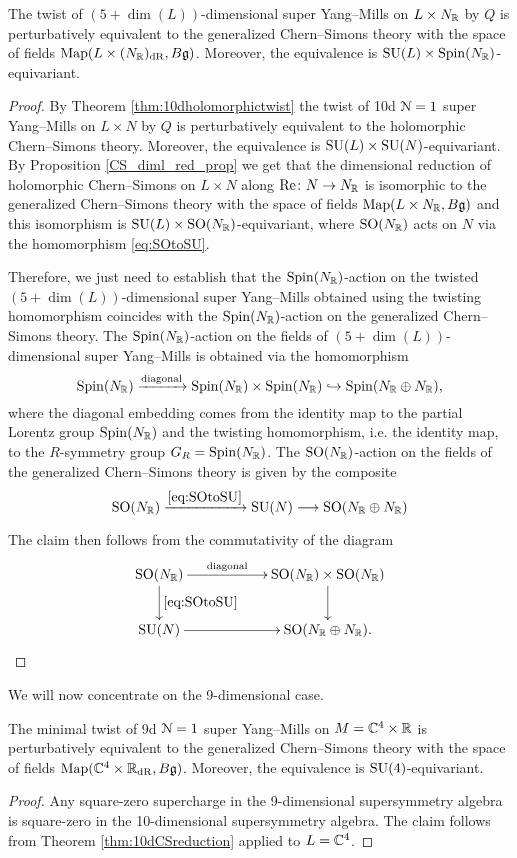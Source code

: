 \documentclass[10pt, oneside]{article}
\begin{document}
\begin{theorem}
The twist of $(5+\dim(L))$-dimensional super Yang--Mills on $L\times N_\mathbb R$ by $Q$ is perturbatively equivalent to the generalized Chern--Simons theory with the space of fields $\operatorname{Map}(L\times (N_\mathbb R)_{\mathrm{dR}}, B\mathfrak g)$. Moreover, the equivalence is $\mathrm{SU}(L)\times \mathrm{Spin}(N_\mathbb R)$-equivariant.
\label{thm:10dCSreduction}
\end{theorem}
\begin{proof}
By Theorem \ref{thm:10dholomorphictwist} the twist of 10d $\mathcal N=1$ super Yang--Mills on $L\times N$ by $Q$ is perturbatively equivalent to the holomorphic Chern--Simons theory. Moreover, the equivalence is $\mathrm{SU}(L)\times \mathrm{SU}(N)$-equivariant. By Proposition \ref{CS_diml_red_prop} we get that the dimensional reduction of holomorphic Chern--Simons on $L\times N$ along $\mathrm{Re}\colon N\rightarrow N_\mathbb R$ is isomorphic to the generalized Chern--Simons theory with the space of fields $\operatorname{Map}(L\times N_\mathbb R, B\mathfrak g)$ and this isomorphism is $\mathrm{SU}(L)\times \mathrm{SO}(N_\mathbb R)$-equivariant, where $\mathrm{SO}(N_\mathbb R)$ acts on $N$ via the homomorphism \eqref{eq:SOtoSU}.

Therefore, we just need to establish that the $\mathrm{Spin}(N_\mathbb R)$-action on the twisted $(5+\dim(L))$-dimensional super Yang--Mills obtained using the twisting homomorphism coincides with the $\mathrm{Spin}(N_\mathbb R)$-action on the generalized Chern--Simons theory. The $\mathrm{Spin}(N_\mathbb R)$-action on the fields of $(5+\dim(L))$-dimensional super Yang--Mills is obtained via the homomorphism
\[\mathrm{Spin}(N_\mathbb R)\xrightarrow{\mathrm{diagonal}}\mathrm{Spin}(N_\mathbb R)\times \mathrm{Spin}(N_\mathbb R)\hookrightarrow \mathrm{Spin}(N_\mathbb R\oplus N_\mathbb R),\]
where the diagonal embedding comes from the identity map to the partial Lorentz group $\mathrm{Spin}(N_\mathbb R)$ and the twisting homomorphism, i.e. the identity map, to the $R$-symmetry group $G_R=\mathrm{Spin}(N_\mathbb R)$. The $\mathrm{SO}(N_\mathbb R)$-action on the fields of the generalized Chern--Simons theory is given by the composite
\[\mathrm{SO}(N_\mathbb R)\xrightarrow{\eqref{eq:SOtoSU}} \mathrm{SU}(N)\longrightarrow \mathrm{SO}(N_\mathbb R\oplus N_\mathbb R)\]

The claim then follows from the commutativity of the diagram
\[
\xymatrix@C=2cm{
\SO(N_\RR) \ar^-{\mathrm{diagonal}}[r] \ar^{\eqref{eq:SOtoSU}}[d] & \SO(N_\RR)\times \SO(N_\RR) \ar[d] \\
\SU(N) \ar[r] & \SO(N_\RR\oplus N_\RR).
}
\]
\end{proof}

We will now concentrate on the 9-dimensional case.

\begin{theorem}
The minimal twist of 9d $\mathcal{N}=1$ super Yang--Mills on $M=\mathbb C^4\times \mathbb R$ is perturbatively equivalent to the generalized Chern--Simons theory with the space of fields $\operatorname{Map}(\mathbb C^4\times \mathbb R_{\mathrm{dR}}, B\mathfrak{g})$. Moreover, the equivalence is $\mathrm{SU}(4)$-equivariant.
\label{thm:9dminimaltwist}
\end{theorem}
\begin{proof}
Any square-zero supercharge in the 9-dimensional supersymmetry algebra is square-zero in the 10-dimensional supersymmetry algebra. The claim follows from Theorem \ref{thm:10dCSreduction} applied to $L=\mathbb C^4$.
\end{proof}
\end{document}
